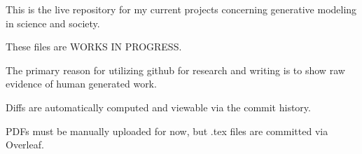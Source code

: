 This is the live repository for my current projects concerning generative modeling in science and society.  

These files are WORKS IN PROGRESS.

The primary reason for utilizing github for research and writing is to show raw evidence of human generated work.

Diffs are automatically computed and viewable via the commit history.

PDFs must be manually uploaded for now, but .tex files are committed via Overleaf.
